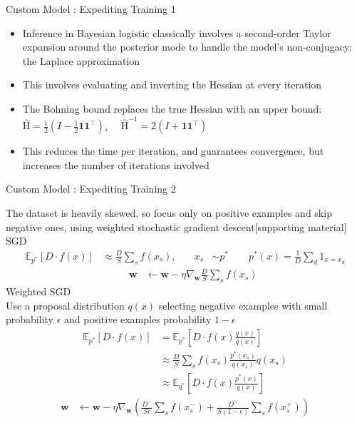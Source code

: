 \documentclass[xcolor=dvipsnames]{beamer}
\begin{document}
\begin{frame}{Custom Model : Expediting Training 1}

\begin{itemize}
\item<1-> Inference in Bayesian logistic classically involves a second-order Taylor expansion around the posterior mode to handle the model's non-conjugacy: the Laplace approximation
\item<2-> This involves evaluating and inverting the Hessian at every iteration
\item<3-> The Bohning bound\cite{BohningLogReg1988} replaces the true Hessian with an upper bound: $\hat{\text{H}} = \frac{1}{2}\left(I - \frac{1}{2}\mathbf{1}\mathbf{1}^\top\right)$, $\quad\hat{\text{H}}^{-1} = 2\left(I + \mathbf{1}\mathbf{1}^\top\right)$
\item<4-> This reduces the time per iteration, and guarantees convergence, but increases the number of iterations involved
\end{itemize}
\end{frame}

\begin{frame}{Custom Model : Expediting Training 2}

The dataset is heavily skewed, so focus only on positive examples and skip negative ones, using weighted stochastic gradient descent\cite{Gopalan2013b}[supporting material]\\
\medskip
{} {
SGD
\begin{align*}
\mathbb{E}_{p^*}[D \cdot f(x)] & \approx \frac{D}{S}\sum_s f(x_s),\quad &
x_s & \sim p^* \qquad p^*(x) = \frac{1}{D} \sum_d 1_{x = x_d}
\end{align*}\begin{align*}
& & \mathbf{w} & \leftarrow \mathbf{w} - \eta \nabla_{\mathbf{w}} \frac{D}{S}\sum_s f(x_s)
\end{align*}
}
 {
Weighted SGD \\
Use a proposal distribution $q(x)$ selecting negative examples with small probability $\epsilon$ and positive examples probability $1-\epsilon$
} {
\begin{align*}
\mathbb{E}_{p^*}[D \cdot f(x)] & = \mathbb{E}_{p^*}[D \cdot f(x) \frac{q(x)}{q(x)}] \\
& \approx \frac{D}{S}\sum_s f(x_s) \frac{p^*(x_s)}{q(x_s)} q(x_s) \\
& \approx \mathbb{E}_{q^*}[D \cdot f(x) \frac{p^*(x)}{q(x)}]
\end{align*}
}
 {
\begin{align*}
\mathbf{w} & \leftarrow \mathbf{w} - \eta \nabla_{\mathbf{w}} \left(\frac{D^-}{S \epsilon}\sum_s f(x^-_s) + \frac{D^+}{S (1 -\epsilon)}\sum_s f(x^+_s)\right)
\end{align*}
}

\end{frame}
\end{document}
